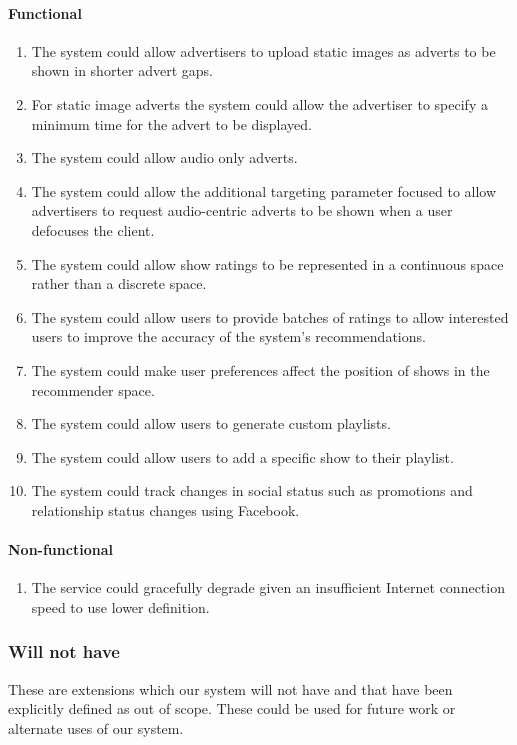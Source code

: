 	\paragraph{Functional}
		\begin{enumerate}
			\item{The system could allow advertisers to upload static images as adverts to be shown in shorter advert gaps.}
			\item{For static image adverts the system could allow the advertiser to specify a minimum time for the advert to be displayed.}
			\item{The system could allow audio only adverts.}
			\item{The system could allow the additional targeting parameter focused to allow advertisers to request audio-centric adverts to be shown when a user defocuses the client.}
			\item{The system could allow show ratings to be represented in a continuous space rather than a discrete space.}
			\item{The system could allow users to provide batches of ratings to allow interested users to improve the accuracy of the system's recommendations.}
			\item{The system could make user preferences affect the position of shows in the recommender space.}
			\item{The system could allow users to generate custom playlists.}
			\item{The system could allow users to add a specific show to their playlist.}
			\item{The system could track changes in social status such as promotions and relationship status changes using Facebook.}
		\end{enumerate}
	\paragraph{Non-functional}
		\begin{enumerate}
			\item{The service could gracefully degrade given an insufficient Internet connection speed to use lower definition.}
		\end{enumerate}
\subsubsection{Will not have}
These are extensions which our system will not have and that have been explicitly defined as out of scope. These could be used for future work or alternate uses of our system.

